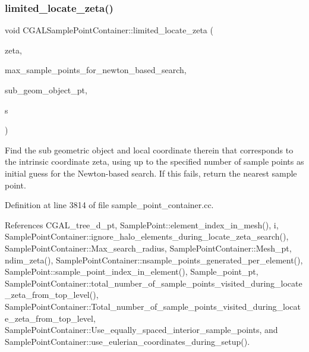 \subsubsection{\texorpdfstring{limited\+\_\+locate\+\_\+zeta()}{limited\_locate\_zeta()}}
{\footnotesize\ttfamily void C\+G\+A\+L\+Sample\+Point\+Container\+::limited\+\_\+locate\+\_\+zeta (\begin{DoxyParamCaption}\item[{const Vector$<$ double $>$ \&}]{zeta,  }\item[{const unsigned \&}]{max\+\_\+sample\+\_\+points\+\_\+for\+\_\+newton\+\_\+based\+\_\+search,  }\item[{Geom\+Object $\ast$\&}]{sub\+\_\+geom\+\_\+object\+\_\+pt,  }\item[{Vector$<$ double $>$ \&}]{s }\end{DoxyParamCaption})}



Find the sub geometric object and local coordinate therein that corresponds to the intrinsic coordinate zeta, using up to the specified number of sample points as initial guess for the Newton-\/based search. If this fails, return the nearest sample point. 



Definition at line 3814 of file sample\+\_\+point\+\_\+container.\+cc.



References C\+G\+A\+L\+\_\+tree\+\_\+d\+\_\+pt, Sample\+Point\+::element\+\_\+index\+\_\+in\+\_\+mesh(), i, Sample\+Point\+Container\+::ignore\+\_\+halo\+\_\+elements\+\_\+during\+\_\+locate\+\_\+zeta\+\_\+search(), Sample\+Point\+Container\+::\+Max\+\_\+search\+\_\+radius, Sample\+Point\+Container\+::\+Mesh\+\_\+pt, ndim\+\_\+zeta(), Sample\+Point\+Container\+::nsample\+\_\+points\+\_\+generated\+\_\+per\+\_\+element(), Sample\+Point\+::sample\+\_\+point\+\_\+index\+\_\+in\+\_\+element(), Sample\+\_\+point\+\_\+pt, Sample\+Point\+Container\+::total\+\_\+number\+\_\+of\+\_\+sample\+\_\+points\+\_\+visited\+\_\+during\+\_\+locate\+\_\+zeta\+\_\+from\+\_\+top\+\_\+level(), Sample\+Point\+Container\+::\+Total\+\_\+number\+\_\+of\+\_\+sample\+\_\+points\+\_\+visited\+\_\+during\+\_\+locate\+\_\+zeta\+\_\+from\+\_\+top\+\_\+level, Sample\+Point\+Container\+::\+Use\+\_\+equally\+\_\+spaced\+\_\+interior\+\_\+sample\+\_\+points, and Sample\+Point\+Container\+::use\+\_\+eulerian\+\_\+coordinates\+\_\+during\+\_\+setup().

\mbox{\label{classCGALSamplePointContainer_a059a8f0ebd74ffbc48722122b01e172b}} 
